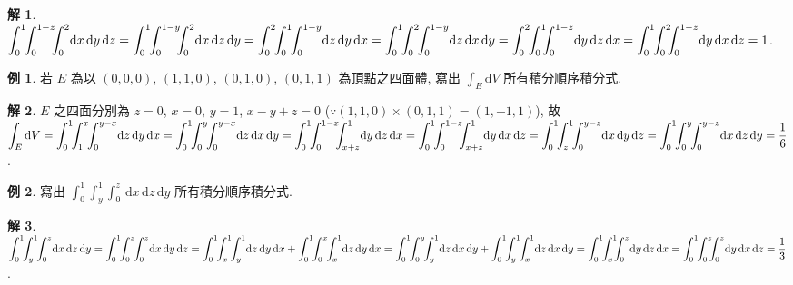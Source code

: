 \documentclass[12pt]{extarticle}
\newcommand{\ds}{\displaystyle}
\theoremstyle{definition}
\newtheorem*{ex}{例}
\newtheorem*{sol}{解}
\begin{document}
{\begin{sol}
  $\ds\int_0^1\!\!\int_0^{1 - z}\!\!\!\int_0^{2}\!\!\,\text{d}x\,\text{d}y\,\text{d}z = \int_0^1\!\!\int_0^{1 - y}\!\!\!\int_0^2\!\!\,\text{d}x\,\text{d}z\,\text{d}y = \int_0^2\!\!\int_0^1\!\!\int_0^{1 - y}\!\!\,\text{d}z\,\text{d}y\,\text{d}x = \int_0^1\!\!\int_0^2\!\!\int_0^{1 - y}\!\!\,\text{d}z\,\text{d}x\,\text{d}y = \int_0^2\!\!\int_0^{1}\!\!\!\int_0^{1 - z}\!\!\,\text{d}y\,\text{d}z\,\text{d}x \\= \int_0^1\!\!\int_0^2\!\!\!\int_0^{1 - z}\!\!\,\text{d}y\,\text{d}x\,\text{d}z = 1$.
\end{sol}

\begin{ex}
  若 $E$ 為以 $(0, 0, 0)$, $(1, 1, 0)$, $(0, 1, 0)$, $(0, 1, 1)$ 為頂點之四面體, 寫出 $\ds\int_E\text{d}V$ 所有積分順序積分式.
\end{ex}

\begin{sol}
  $E$ 之四面分別為 $z = 0$, $x = 0$, $y = 1$, $x - y + z = 0$ ($\ds\because(1, 1, 0)\times(0, 1, 1) = (1, -1, 1)$), 故 \\$\ds\int_E\text{d}V = \int_0^1\!\!\int_1^{x}\!\!\int_0^{y - x}\!\!\,\text{d}z\,\text{d}y\,\text{d}x = \int_0^1\!\!\int_0^{y}\!\!\int_0^{y - x}\!\!\,\text{d}z\,\text{d}x\,\text{d}y = \int_0^1\!\!\int_0^{1 - x}\!\!\!\int_{x + z}^1\!\!\,\text{d}y\,\text{d}z\,\text{d}x = \int_0^1\!\!\int_0^{1 - z}\!\!\!\int_{x + z}^1\!\!\,\text{d}y\,\text{d}x\,\text{d}z \\ = \int_0^1\!\!\int_z^{1}\!\!\int_0^{y - z}\!\!\,\text{d}x\,\text{d}y\,\text{d}z = \int_0^1\!\!\int_0^{y}\!\!\int_0^{y - z}\!\!\,\text{d}x\,\text{d}z\,\text{d}y = \frac{1}{6}$.
\end{sol}

\begin{ex}
  寫出 $\ds\int_0^1\!\!\int_y^{1}\!\!\int_0^{z}\!\!\,\text{d}x\,\text{d}z\,\text{d}y$ 所有積分順序積分式.
\end{ex}

\begin{sol}
  $\ds\int_0^1\!\!\int_y^{1}\!\!\int_0^{z}\!\!\,\text{d}x\,\text{d}z\,\text{d}y = \int_0^1\!\!\int_0^z\!\!\int_0^z\!\!\,\text{d}x\,\text{d}y\,\text{d}z = \int_0^1\!\!\int_x^1\!\!\int_y^1\!\!\,\text{d}z\,\text{d}y\,\text{d}x + \int_0^1\!\!\int_0^{x}\!\!\int_x^1\!\!\,\text{d}z\,\text{d}y\,\text{d}x \\= \int_0^1\!\!\int_0^{y}\!\!\int_y^1\!\!\,\text{d}z\,\text{d}x\,\text{d}y + \int_0^1\!\!\int_y^1\!\!\int_x^{1}\!\!\,\text{d}z\,\text{d}x\,\text{d}y = \int_0^1\!\!\int_x^{1}\!\!\!\int_0^z\!\!\,\text{d}y\,\text{d}z\,\text{d}x = \int_0^1\!\!\int_0^z\!\!\!\int_0^z\!\!\,\text{d}y\,\text{d}x\,\text{d}z = \frac{1}{3}$.
\end{sol}

}
\end{document}
